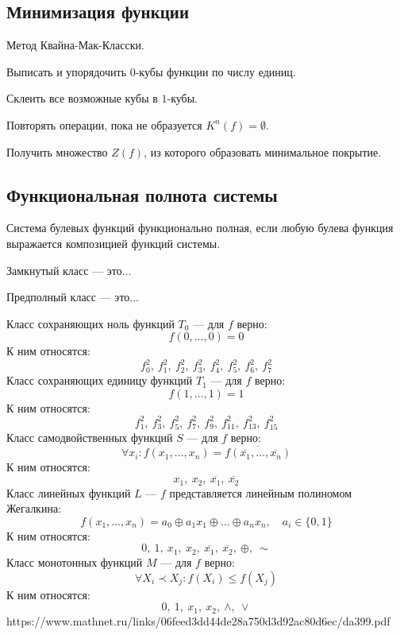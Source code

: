 \subsection{Минимизация функции}

\begin{theorem}
{\bold Метод Квайна-Мак-Класски.}
\begin{list*}[][\#]
\item Выписать и упорядочить $0$-кубы функции по числу единиц.
\item Склеить все возможные кубы в $1$-кубы.
\item Повторять операции, пока не образуется $K^n(f)=\emptyset$.
\item Получить множество $Z(f)$, из которого образовать минимальное покрытие. 
\end{list*}
\end{theorem}

\subsection{Функциональная полнота системы}

Система булевых функций {\bold функционально полная}, если любую булева функция выражается композицией функций системы.

{\bold Замкнутый класс} --- это...

{\bold Предполный класс} --- это...

Класс {\bold сохраняющих ноль} функций $T_0$ --- для $f$ верно:
$$f(0,\dots,0)=0$$
К ним относятся:
$$f^2_0,\ f^2_1,\ f^2_2,\ f^2_3,\ f^2_4,\ f^2_5,\ f^2_6,\ f^2_7$$
Класс {\bold сохраняющих единицу} функций $T_1$ --- для $f$ верно:
$$f(1,\dots,1)=1$$
К ним относятся:
$$f^2_1,\ f^2_3,\ f^2_5,\ f^2_7,\ f^2_9,\ f^2_{11},\ f^2_{13},\ f^2_{15}$$
Класс {\bold самодвойственных функций} $S$ --- для $f$ верно:
$$\forall x_i\colon f(x_1,\dots,x_n)=\overline{f(\overline{x_1},\dots,\overline{x_n})}$$
К ним относятся:
$$x_1,\ x_2,\ \overline{x_1},\ \overline{x_2}$$
Класс {\bold линейных функций} $L$ --- $f$ представляется {\ital линейным} полиномом Жегалкина:
$$f(x_1,\dots,x_n)=a_0\oplus a_1x_1\oplus\dots\oplus a_nx_n,\quad a_i\in\{0,1\}$$
К ним относятся:
$$0,\ 1,\ x_1,\ x_2,\ \overline{x_1},\ \overline{x_2},\ \oplus,\ \sim$$
Класс {\bold монотонных функций} $M$ --- для $f$ верно:
$$\forall X_i\prec X_j\colon f(X_i)\leq f(X_j)$$
К ним относятся:
$$0,\ 1,\ x_1,\ x_2,\ \land,\ \lor$$
https://www.mathnet.ru/links/06feed3dd44de28a750d3d92ac80d6ec/da399.pdf


